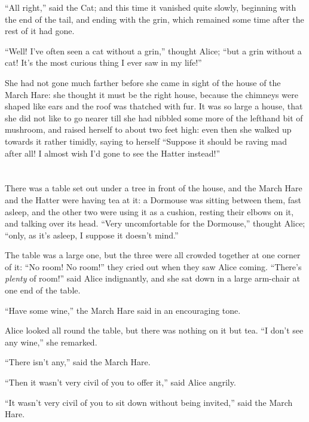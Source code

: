 \documentclass[book, 20pt]{extbook}
\begin{document}
``All right,'' said the Cat; and this time it vanished quite slowly,
beginning with the end of the tail, and ending with the grin, which
remained some time after the rest of it had gone.

``Well! I've often seen a cat without a grin,'' thought Alice; ``but a
grin without a cat! It's the most curious thing I ever saw in my life!''

She had not gone much farther before she came in sight of the house of
the March Hare: she thought it must be the right house, because the
chimneys were shaped like ears and the roof was thatched with fur. It
was so large a house, that she did not like to go nearer till she had
nibbled some more of the lefthand bit of mushroom, and raised herself to
about two feet high: even then she walked up towards it rather timidly,
saying to herself ``Suppose it should be raving mad after all! I almost
wish I'd gone to see the Hatter instead!''

\chapter*{}

There was a table set out under a tree in front of the house, and the
March Hare and the Hatter were having tea at it: a Dormouse was sitting
between them, fast asleep, and the other two were using it as a cushion,
resting their elbows on it, and talking over its head. ``Very
uncomfortable for the Dormouse,'' thought Alice; ``only, as it's asleep,
I suppose it doesn't mind.''

The table was a large one, but the three were all crowded together at
one corner of it: ``No room! No room!'' they cried out when they saw
Alice coming. ``There's \emph{plenty} of room!'' said Alice indignantly,
and she sat down in a large arm-chair at one end of the table.

``Have some wine,'' the March Hare said in an encouraging tone.

Alice looked all round the table, but there was nothing on it but tea.
``I don't see any wine,'' she remarked.

``There isn't any,'' said the March Hare.

``Then it wasn't very civil of you to offer it,'' said Alice angrily.

``It wasn't very civil of you to sit down without being invited,'' said
the March Hare.
\end{document}
